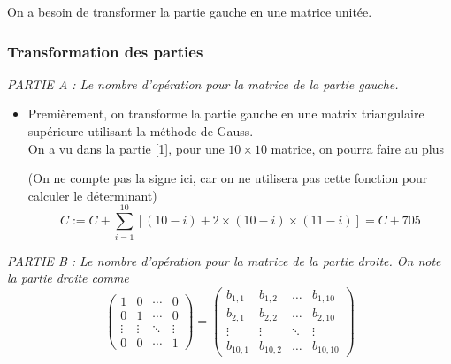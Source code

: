 \documentclass{article}
\begin{document}
On a besoin de transformer la partie gauche en une matrice unitée.

\subsubsection{Transformation des parties}\label{2}
\begin{tcolorbox}
    \textit{ PARTIE A : Le nombre d'opération pour la matrice de la partie gauche.}\label{2A}
\end{tcolorbox}
\begin{itemize}
    \item Premièrement, on transforme la partie gauche en une matrix triangulaire supérieure utilisant la méthode de Gauss.\\ On a vu dans la partie \ref{1}, pour une $10 \times 10$ matrice, on pourra faire au plus 

        \begin{tcolorbox}
            (On ne compte pas la signe ici, car on ne utilisera pas cette fonction pour calculer le déterminant)
        \[
            C := C + \sum_{i=1}^{10} [(10-i) + 2 \times  (10-i) \times (11-i)]   = C + 705
        \]
        \end{tcolorbox}
        
       \end{itemize}

\begin{tcolorbox}
    \textit{PARTIE B : Le nombre d'opération pour la matrice de la partie droite. On note la partie droite comme} \label{2B}
\[
\begin{pmatrix}
    1 & 0 & \cdots & 0 \\
    0 & 1 & \cdots & 0 \\
    \vdots & \vdots & \ddots & \vdots \\
    0 & 0 & \cdots & 1
\end{pmatrix} = 
\begin{pmatrix}
    b_{1,1} & b_{1,2} & \ldots & b_{1, 10} \\
    b_{2,1} & b_{2,2} & \ldots & b_{2, 10} \\
    \vdots & \vdots & \ddots & \vdots \\
    b_{10,1} & b_{10,2} & \ldots & b_{10, 10}
\end{pmatrix}
\]

\end{tcolorbox}
\end{document}
